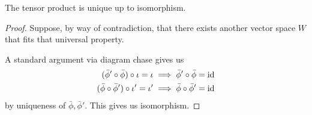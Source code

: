 \begin{theorem}\label{thm:tensor-unique}
    The tensor product is unique up to isomorphism.
\end{theorem}
\begin{proof}
    Suppose, by way of contradiction, that there exists another vector space \(W\)
    that fits that universal property.
    \begin{center}
    \end{center}
    A standard argument via diagram chase gives us
    \begin{align*}
        (\bar{\phi}'\circ\bar{\phi})\circ\iota = \iota &\implies \bar{\phi}'\circ\bar{\phi} = \operatorname{id} \\
        (\bar{\phi}\circ\bar{\phi}')\circ\iota' = \iota' &\implies \bar{\phi}\circ\bar{\phi}' = \operatorname{id}
    \end{align*}
    by uniqueness of \(\bar{\phi},\bar{\phi}'\).
    This gives us isomorphism.
\end{proof}

